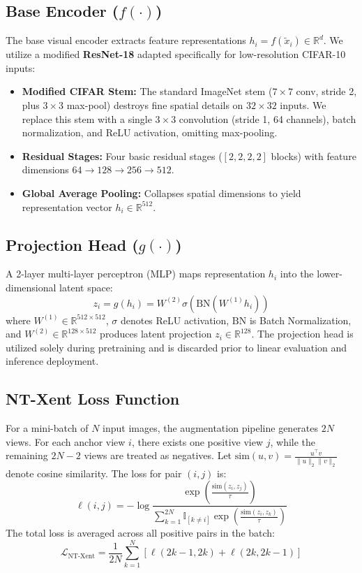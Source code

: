 \documentclass[conference]{IEEEtran}
\begin{document}
\subsection{Base Encoder ($f(\cdot)$)}
The base visual encoder extracts feature representations $h_i = f(\tilde{x}_i) \in \mathbb{R}^{d}$. We utilize a modified \textbf{ResNet-18} adapted specifically for low-resolution CIFAR-10 inputs:
\begin{itemize}
    \item \textbf{Modified CIFAR Stem:} The standard ImageNet stem ($7 \times 7$ conv, stride 2, plus $3 \times 3$ max-pool) destroys fine spatial details on $32 \times 32$ inputs. We replace this stem with a single $3 \times 3$ convolution (stride 1, 64 channels), batch normalization, and ReLU activation, omitting max-pooling.
    \item \textbf{Residual Stages:} Four basic residual stages ($[2, 2, 2, 2]$ blocks) with feature dimensions $64 \to 128 \to 256 \to 512$.
    \item \textbf{Global Average Pooling:} Collapses spatial dimensions to yield representation vector $h_i \in \mathbb{R}^{512}$.
\end{itemize}

\subsection{Projection Head ($g(\cdot)$)}
A 2-layer multi-layer perceptron (MLP) maps representation $h_i$ into the lower-dimensional latent space:
\begin{equation}
z_i = g(h_i) = W^{(2)} \sigma\left(\text{BN}\left(W^{(1)} h_i\right)\right)
\end{equation}
where $W^{(1)} \in \mathbb{R}^{512 \times 512}$, $\sigma$ denotes ReLU activation, $\text{BN}$ is Batch Normalization, and $W^{(2)} \in \mathbb{R}^{128 \times 512}$ produces latent projection $z_i \in \mathbb{R}^{128}$. The projection head is utilized solely during pretraining and is discarded prior to linear evaluation and inference deployment.

\subsection{NT-Xent Loss Function}
For a mini-batch of $N$ input images, the augmentation pipeline generates $2N$ views. For each anchor view $i$, there exists one positive view $j$, while the remaining $2N-2$ views are treated as negatives. Let $\text{sim}(u, v) = \frac{u^\top v}{\|u\|_2 \|v\|_2}$ denote cosine similarity. The loss for pair $(i, j)$ is:
\begin{equation}
\ell(i, j) = -\log \frac{\exp\left(\frac{\text{sim}(z_i, z_j)}{\tau}\right)}{\sum_{k=1}^{2N} \mathbb{I}_{[k \neq i]} \exp\left(\frac{\text{sim}(z_i, z_k)}{\tau}\right)}
\end{equation}
The total loss is averaged across all positive pairs in the batch:
\begin{equation}
\mathcal{L}_{\text{NT-Xent}} = \frac{1}{2N} \sum_{k=1}^{N} \left[ \ell(2k-1, 2k) + \ell(2k, 2k-1) \right]
\end{equation}
\end{document}
